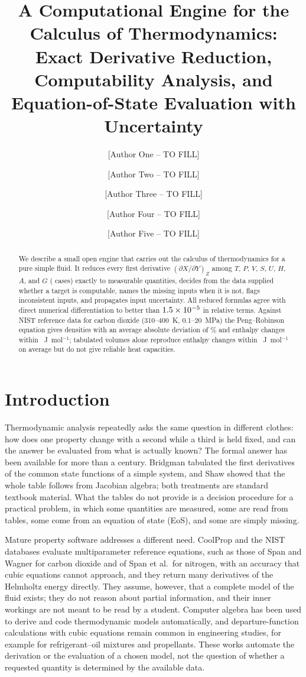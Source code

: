 \documentclass[journal=iecred,manuscript=article,layout=twocolumn]{achemso}
\author{[Author One -- TO FILL]}
\author{[Author Two -- TO FILL]}
\author{[Author Three -- TO FILL]}
\author{[Author Four -- TO FILL]}
\author{[Author Five -- TO FILL]}
\affiliation{[Group name, Department, Institute, City, Postal code, Country -- TO FILL]}
\title{A Computational Engine for the Calculus of Thermodynamics: Exact Derivative
Reduction, Computability Analysis, and Equation-of-State Evaluation with
Uncertainty}
\begin{document}
\begin{abstract}
We describe a small open engine that carries out the calculus of thermodynamics
for a pure simple fluid. It reduces every first derivative
$(\partial X/\partial Y)_Z$ among $T$, $P$, $V$, $S$, $U$, $H$, $A$, and $G$
(\NDerivTotal{} cases) exactly to measurable quantities, decides from the data
supplied whether a target is computable, names the missing inputs when it is
not, flags inconsistent inputs, and propagates input uncertainty. All reduced
formulas agree with direct numerical differentiation to better than
$1.5 \times 10^{-5}$ in relative terms. Against NIST reference data for carbon
dioxide (310--400~K, 0.1--20~MPa) the Peng--Robinson equation gives densities
with an average absolute deviation of \PRrhoAAD\% and enthalpy changes within
\PRdHAAD~J~mol$^{-1}$; tabulated volumes alone reproduce enthalpy changes within
\TabdHAAD~J~mol$^{-1}$ on average but do not give reliable heat capacities.
\end{abstract}

\section{Introduction}

Thermodynamic analysis repeatedly asks the same question in different clothes:
how does one property change with a second while a third is held fixed, and can
the answer be evaluated from what is actually known? The formal answer has been
available for more than a century. Bridgman tabulated the first derivatives of
the common state functions of a simple system,\cite{Bridgman1914} and
Shaw\cite{Shaw1935} showed that the whole table follows from Jacobian algebra;
both treatments are standard textbook material.\cite{Callen1985,Smith2018} What
the tables do not provide is a decision procedure for a practical problem, in
which some quantities are measured, some are read from tables, some come from
an equation of state (EoS), and some are simply missing.

Mature property software addresses a different need. CoolProp\cite{Bell2014}
and the NIST databases\cite{NISTWebBook} evaluate multiparameter reference
equations, such as those of Span and Wagner for carbon
dioxide\cite{Span1996} and of Span et al.\ for nitrogen,\cite{Span2000} with
an accuracy that cubic equations cannot approach, and they return many
derivatives of the Helmholtz energy directly. They assume, however, that a
complete model of the fluid exists; they do not reason about partial
information, and their inner workings are not meant to be read by a student.
Computer algebra has been used to derive and code thermodynamic models
automatically,\cite{Castier1999} and departure-function calculations with cubic
equations remain common in engineering studies, for example for
refrigerant--oil mixtures\cite{MarcelinoNeto2013} and
propellants.\cite{daSilva2023} These works automate the derivation or the
evaluation of a chosen model, not the question of whether a requested quantity
is determined by the available data.
\end{document}
